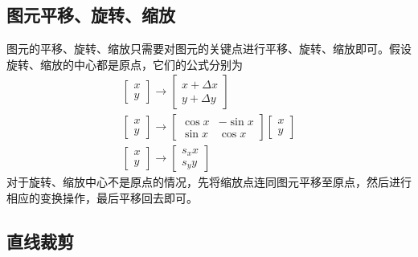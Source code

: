 \documentclass[a4paper,12pt]{article}
\begin{document}
\subsection{图元平移、旋转、缩放}
图元的平移、旋转、缩放只需要对图元的关键点进行平移、旋转、缩放即可。假设旋转、缩放的中心都是原点，它们的公式分别为
\begin{gather}
\begin{bmatrix} x \\ y \end{bmatrix} \rightarrow \begin{bmatrix} x + \Delta x \\ y + \Delta y \end{bmatrix} \\
\begin{bmatrix} x \\ y \end{bmatrix} \rightarrow \begin{bmatrix} \cos x & -\sin x \\ \sin x & \cos x  \end{bmatrix} \begin{bmatrix} x \\ y  \end{bmatrix} \\
\begin{bmatrix} x \\ y \end{bmatrix} \rightarrow \begin{bmatrix} s_x x \\ s_y y  \end{bmatrix}
\end{gather}
对于旋转、缩放中心不是原点的情况，先将缩放点连同图元平移至原点，然后进行相应的变换操作，最后平移回去即可。

\subsection{直线裁剪}
\end{document}
